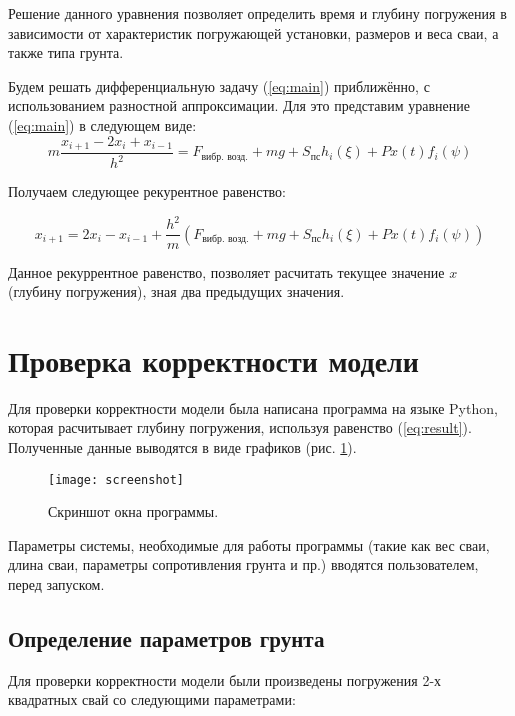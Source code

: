 Решение данного уравнения позволяет определить время и глубину погружения в зависимости от характеристик погружающей
установки, размеров и веса сваи, а также типа грунта.

Будем решать дифференциальную задачу (\ref{eq:main}) приближённо, с использованием разностной аппроксимации.
Для это представим уравнение (\ref{eq:main}) в следующем виде:
\begin{equation}
        m\frac{x_{i+1} - 2x_i + x_{i-1}}{h^2} = F_\text{вибр. возд.} + mg + S_\text{пс} h_i(\xi)+ P x(t) f_i(\psi)
\end{equation}

Получаем следующее рекурентное равенство:

\begin{equation}
    \label{eq:result}
    x_{i+1} = 2x_i - x_{i-1} + \frac{h^2}{m}(F_\text{вибр. возд.} + mg + S_\text{пс} h_i(\xi) + P x(t) f_i(\psi))
\end{equation}

\noindent Данное рекуррентное равенство, позволяет расчитать текущее значение $x$ (глубину погружения), зная два предыдущих значения.

\clearpage

\section{Проверка корректности модели}

Для проверки корректности модели была написана программа на языке Python, которая расчитывает глубину
погружения, используя равенство (\ref{eq:result}). Полученные данные выводятся в виде графиков
(рис. \ref{fig:screenshot}).

\begin{figure}[ht]
    \centering
    \texttt{[image: screenshot]}
    \caption{Скриншот окна программы.}
    \label{fig:screenshot}
\end{figure}

\noindent Параметры системы, необходимые для работы программы (такие как вес сваи, длина сваи, параметры сопротивления грунта
и пр.) вводятся пользователем, перед запуском.

\subsection{Определение параметров грунта}

Для проверки корректности модели были произведены погружения 2-х квадратных свай со следующими параметрами:

